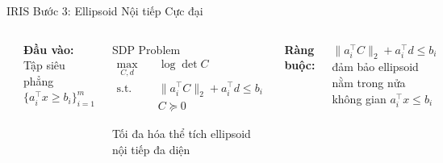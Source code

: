 \documentclass[aspectratio=169]{beamer}
\begin{document}
    
\begin{frame}{IRIS Bước 3: Ellipsoid Nội tiếp Cực đại}
    \begin{columns}[c]
        \includegraphics[width=\textwidth]{../imgs/iris_2.png}

        
        \textbf{Đầu vào:} Tập siêu phẳng $\{a_i^\top x \geq b_i\}_{i=1}^m$

        \begin{block}{SDP Problem}
            \small
            \[
                \begin{aligned}
                    \max_{C,d} \quad  & \log \det C                            \\
                    \text{s.t.} \quad & \|a_i^\top C\|_2 + a_i^\top d \leq b_i \\
                                      & C \succeq 0
                \end{aligned}
            \]

            Tối đa hóa thể tích ellipsoid nội tiếp đa diện
        \end{block}

        \vspace{0.5em}
        \textbf{Ràng buộc:}
        
        $\|a_i^\top C\|_2 + a_i^\top d \leq b_i$ đảm bảo ellipsoid nằm trong nửa không gian $a_i^\top x \leq b_i$
    \end{columns}
\end{frame}
\end{document}
